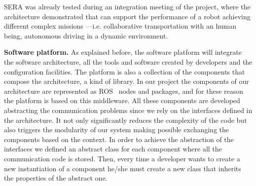 SERA was already tested during an integration meeting of the project, where the architecture demonstrated that can support the performance of a robot achieving different complex missions ---i.e. collaborative transportation with an human being, autonomous driving in a dynamic environment.


\textbf{Software platform.}
As explained before, the software platform will integrate the software architecture, all the tools and software created by developers and the configuration facilities.
The platform is also a collection of the components that compose the architecture, a kind of library.
In our project the components of our architecture are represented as ROS~\cite{Quigley2009} nodes and packages, and for these reason the platform is based on this middleware.
All these components are developed abstracting the communication problems since we rely on the interfaces defined in the architecture.
It not only significantly reduces the complexity of the code but also triggers the modularity of our system making possible exchanging the components based on the context.
In order to achieve the abstraction of the interfaces we defined an abstract class for each component where all the communication code is stored.
Then, every time a developer wants to create a new instantiation of a component he/she must create a new class  that inherits the properties of the abstract one.


